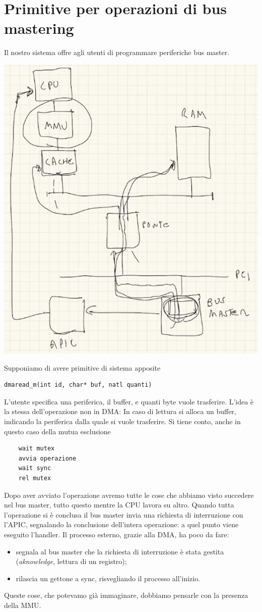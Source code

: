 \documentclass[11pt]{report}
\theoremstyle{definition}
\begin{document}
\section{Primitive per operazioni di bus mastering}
Il nostro sistema offre agli utenti di programmare periferiche bus master. 
\begin{center}
	\includegraphics[scale=.6]{img/282.PNG}
\end{center}
Supponiamo di avere primitive di sistema apposite
\begin{verbatim}
dmaread_m(int id, char* buf, natl quanti)
\end{verbatim}
L'utente specifica una periferica, il buffer, e quanti byte vuole trasferire. L'idea è la stessa dell'operazione non in DMA: In caso di lettura si alloca un buffer, indicando la periferica dalla quale si vuole trasferire. Si tiene conto, anche in questo caso della mutua esclusione
\begin{verbatim}
	wait mutex
	avvia operazione
	wait sync
	rel mutex
\end{verbatim}
Dopo aver avviato l'operazione avremo tutte le cose che abbiamo visto succedere nel bus master, tutto questo mentre la CPU lavora su altro. Quando tutta l'operazione si è conclusa il bus master invia una richiesta di interruzione con l'APIC, segnalando la conclusione dell'intera operazione: a quel punto viene eseguito l'handler. Il processo esterno, grazie alla DMA, ha poco da fare:
\begin{itemize}
	\item segnala al bus master che la richiesta di interruzione è stata gestita (\emph{aknowledge}, lettura di un registro);
	\item rilascia un gettone a sync, risvegliando il processo all'inizio.
\end{itemize}
Queste cose, che potevamo già immaginare, dobbiamo pensarle con la presenza della MMU. 
\end{document}

